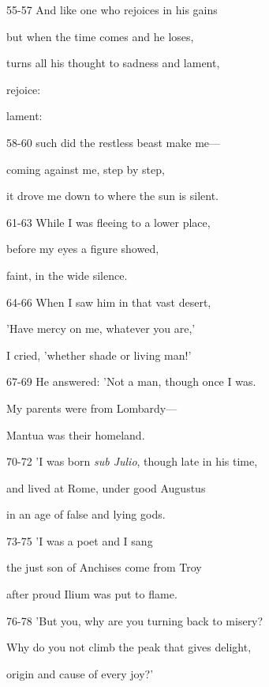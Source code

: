 \documentclass[oneside]{ctexbook}
\begin{document}
\begin{mytext}{55-57}
And like one who rejoices in his gains

but when the time comes and he loses,

turns all his thought to sadness and lament,

\tcblower

rejoice:

lament:
\end{mytext}

\begin{mytext}{58-60}
such did the restless beast make me—

coming against me, step by step,

it drove me down to where the sun is silent.
\end{mytext}

\begin{mytext}{61-63}
While I was fleeing to a lower place,

before my eyes a figure showed,

faint, in the wide silence.
\end{mytext}

\begin{mytext}{64-66}
When I saw him in that vast desert,

'Have mercy on me, whatever you are,'

I cried, 'whether shade or living man!'
\end{mytext}

\begin{mytext}{67-69}
He answered: 'Not a man, though once I was.

My parents were from Lombardy—

Mantua was their homeland.
\end{mytext}

\begin{mytext}{70-72}
'I was born \textit{sub Julio}, though late in his time,

and lived at Rome, under good Augustus

in an age of false and lying gods.
\end{mytext}

\begin{mytext}{73-75}
'I was a poet and I sang

the just son of Anchises come from Troy

after proud Ilium was put to flame.
\end{mytext}

\begin{mytext}{76-78}
'But you, why are you turning back to misery?

Why do you not climb the peak that gives delight,

origin and cause of every joy?'
\end{mytext}
\end{document}
